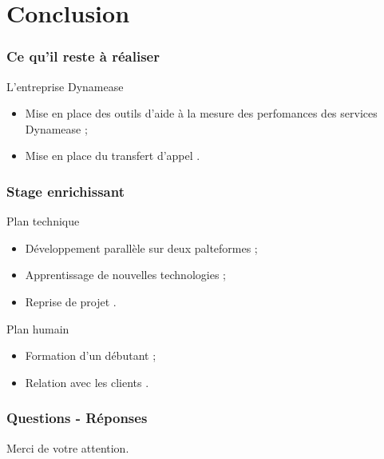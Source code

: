 \section{Conclusion}
\author{Kévin Moreau}


\begin{frame}
	\frametitle{Ce qu'il reste à réaliser}

	\begin{block}{L'entreprise Dynamease}
	 \begin{itemize}
      \item Mise en place des outils d'aide à la mesure des perfomances des services Dynamease ;
      \item Mise en place du transfert d'appel .
	 \end{itemize}
	\end{block}
\end{frame}

\begin{frame}
	\frametitle{Stage enrichissant}

	\begin{block}{Plan technique}
	 \begin{itemize}
      \item Développement parallèle sur deux palteformes ;
	  \item Apprentissage de nouvelles technologies ;
	  \item Reprise de projet .
	 \end{itemize}
	\end{block}

	\begin{block}{Plan humain}
	 \begin{itemize}
      \item Formation d'un débutant ;
	  \item Relation avec les clients .
	 \end{itemize}
	\end{block}

\end{frame}

\begin{frame}
	\frametitle{Questions - Réponses}
	\begin{center}
    	Merci de votre attention.
	\end{center}

\end{frame}


